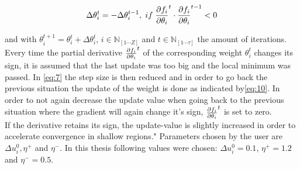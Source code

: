 \begin{equation}\label{eq:10}
	\Delta \theta^t_i = -\Delta \theta^{t-1}_i, \hspace{1mm} if \hspace{1mm} \pdv{f_i}{\theta_i}^t \cdot \pdv{f_i}{\theta_i}^{t-1} < 0
\end{equation}



and with $\theta_i^{t+1} = \theta_i^{t} + \Delta \theta^t_i$, $i \in \mathbb{N}_{[1\cdots Z]}$ and $t \in \mathbb{N}_{[1 \cdots \mathbb{\tau}]}$ the amount of iterations. Every time the partial derivative $\pdv{f_i}{\theta_i}^t$ of the corresponding weight $\theta_i^t$ changes its sign, it is assumed that the last update was too big and the local minimum was passed. In \ref{eq:7} the step size is then reduced and in order to go back the previous situation the update of the weight is done as indicated by\ref{eq:10}. In order to not again decrease the update value when going back to the previous situation where the gradient will again change it's sign,  $\pdv{f_i}{\theta_i}^{t}$ is set to zero.\\
If the derivative retains its sign, the update-value is slightly increased in order to accelerate convergence in shallow regions." \cite{RPROP} Parameters chosen by the user are $\Delta u^0_i, \eta^+$ and $\eta^-$. In this thesis following values were chosen: $\Delta u^0_i = 0.1$, $\eta^+ = 1.2$ and $\eta^- = 0.5$.

%



